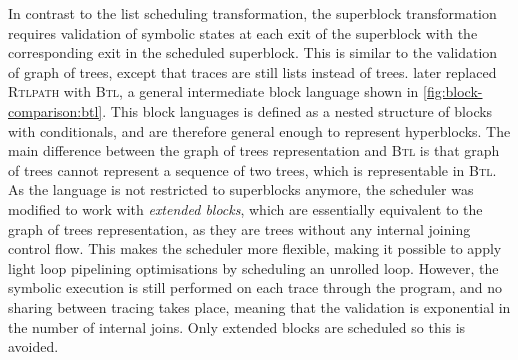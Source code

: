 In contrast to the list scheduling transformation, the superblock transformation
requires validation of symbolic states at each exit of the superblock with the
corresponding exit in the scheduled \gls{superblock}.  This is similar to the
validation of graph of trees, except that traces are still lists instead of
trees.  \textcite[]{gourdin23_fvopbs} later replaced \textsc{Rtlpath} with
\textsc{Btl}, a general intermediate block language shown in
\cref{fig:block-comparison:btl}.  This block languages is defined as a nested
structure of blocks with conditionals, and are therefore general enough to
represent \glspl{hyperblock}.  The main difference between the graph of trees
representation and \textsc{Btl} is that graph of trees cannot represent a
sequence of two trees, which is representable in \textsc{Btl}.  As the language
is not restricted to superblocks anymore, the scheduler was modified to work
with \emph{extended blocks}, which are essentially equivalent to the graph of
trees representation, as they are trees without any internal joining
\gls{control flow}.  This makes the scheduler more flexible, making it possible
to apply light loop pipelining optimisations by scheduling an unrolled loop.
However, the symbolic execution is still performed on each trace through the
program, and no sharing between tracing takes place, meaning that the validation
is exponential in the number of internal joins.  Only extended blocks are
scheduled so this is avoided.





